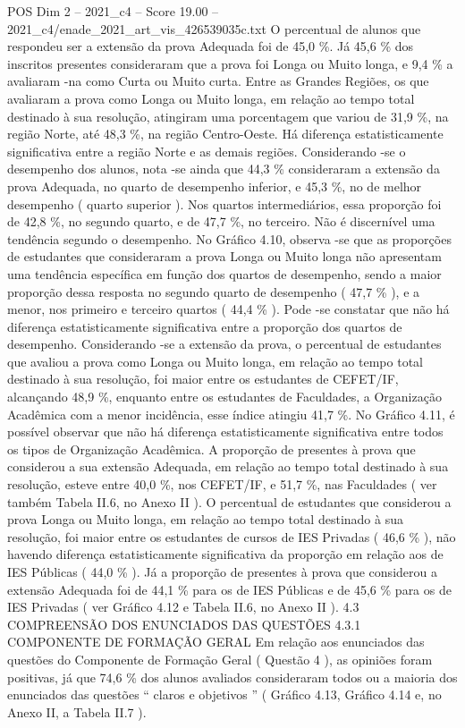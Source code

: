 \begin{textsample}{POS Dim 2 – 2021\_c4 – Score 19.00 – 2021\_c4/enade\_2021\_art\_vis\_426539035c.txt}
O percentual de alunos que respondeu ser a extensão da prova Adequada foi de 45,0 \%.
Já 45,6 \% dos inscritos presentes consideraram que a prova foi Longa ou Muito longa, e 9,4 \% a avaliaram -na como Curta ou Muito curta.
Entre as Grandes Regiões, os que avaliaram a prova como Longa ou Muito longa, em relação ao tempo total destinado à sua resolução, atingiram uma porcentagem que variou de 31,9 \%, na região Norte, até 48,3 \%, na região Centro-Oeste.
Há diferença estatisticamente significativa entre a região Norte e as demais regiões.
Considerando -se o desempenho dos alunos, nota -se ainda que 44,3 \% consideraram a extensão da prova Adequada, no quarto de desempenho inferior, e 45,3 \%, no de melhor desempenho ( quarto superior ).
Nos quartos intermediários, essa proporção foi de 42,8 \%, no segundo quarto, e de 47,7 \%, no terceiro.
Não é discernível uma tendência segundo o desempenho.
No Gráfico 4.10, observa -se que as proporções de estudantes que consideraram a prova Longa ou Muito longa não apresentam uma tendência específica em função dos quartos de desempenho, sendo a maior proporção dessa resposta no segundo quarto de desempenho ( 47,7 \% ), e a menor, nos primeiro e terceiro quartos ( 44,4 \% ).
Pode -se constatar que não há diferença estatisticamente significativa entre a proporção dos quartos de desempenho.
Considerando -se a extensão da prova, o percentual de estudantes que avaliou a prova como Longa ou Muito longa, em relação ao tempo total destinado à sua resolução, foi maior entre os estudantes de CEFET/IF, alcançando 48,9 \%, enquanto entre os estudantes de Faculdades, a Organização Acadêmica com a menor incidência, esse índice atingiu 41,7 \%.
No Gráfico 4.11, é possível observar que não há diferença estatisticamente significativa entre todos os tipos de Organização Acadêmica.
A proporção de presentes à prova que considerou a sua extensão Adequada, em relação ao tempo total destinado à sua resolução, esteve entre 40,0 \%, nos CEFET/IF, e 51,7 \%, nas Faculdades ( ver também Tabela II.6, no Anexo II ).
O percentual de estudantes que considerou a prova Longa ou Muito longa, em relação ao tempo total destinado à sua resolução, foi maior entre os estudantes de cursos de IES Privadas ( 46,6 \% ), não havendo diferença estatisticamente significativa da proporção em relação aos de IES Públicas ( 44,0 \% ).
Já a proporção de presentes à prova que considerou a extensão Adequada foi de 44,1 \% para os de IES Públicas e de 45,6 \% para os de IES Privadas ( ver Gráfico 4.12 e Tabela II.6, no Anexo II ). 4.3 COMPREENSÃO DOS ENUNCIADOS DAS QUESTÕES 4.3.1 COMPONENTE DE FORMAÇÃO GERAL Em relação aos enunciados das questões do Componente de Formação Geral ( Questão 4 ), as opiniões foram positivas, já que 74,6 \% dos alunos avaliados consideraram todos ou a maioria dos enunciados das questões “ claros e objetivos ” ( Gráfico 4.13, Gráfico 4.14 e, no Anexo II, a Tabela II.7 ).

\end{textsample}
